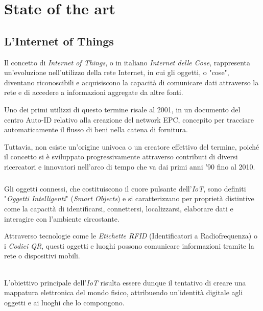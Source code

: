 \documentclass[12pt,a4paper,openright,twoside]{book}
\begin{document}
\chapter{State of the art}

    \section{L'Internet of Things}

        Il concetto di \textit{Internet of Things}, o in italiano \textit{Internet delle Cose}, rappresenta un'evoluzione nell'utilizzo della rete Internet, in cui gli oggetti, o "cose", diventano riconoscibili e acquisiscono la capacità di comunicare dati attraverso la rete e di accedere a informazioni aggregate da altre fonti.

        Uno dei primi utilizzi di questo termine risale al 2001, in un documento del centro Auto-ID relativo alla creazione del network EPC, concepito per tracciare automaticamente il flusso di beni nella catena di fornitura.

        Tuttavia, non esiste un'origine univoca o un creatore effettivo del termine, poiché il concetto si è sviluppato progressivamente attraverso contributi di diversi ricercatori e innovatori nell'arco di tempo che va dai primi anni '90 fino al 2010.

        \paragraph*{}

        Gli oggetti connessi, che costituiscono il cuore pulsante dell’\textit{IoT}, sono definiti "\textit{Oggetti Intelligenti}" (\textit{Smart Objects}) e si caratterizzano per proprietà distintive come la capacità di identificarsi, connettersi, localizzarsi, elaborare dati e interagire con l'ambiente circostante.

        Attraverso tecnologie come le \textit{Etichette RFID} (Identificatori a Radiofrequenza) o i \textit{Codici QR}, questi oggetti e luoghi possono comunicare informazioni tramite la rete o dispositivi mobili.

        \subparagraph*{}

        L'obiettivo principale dell’\textit{IoT} risulta essere dunque il tentativo di creare una mappatura elettronica del mondo fisico, attribuendo un’identità digitale agli oggetti e ai luoghi che lo compongono.

        \subparagraph*{}
\end{document}
